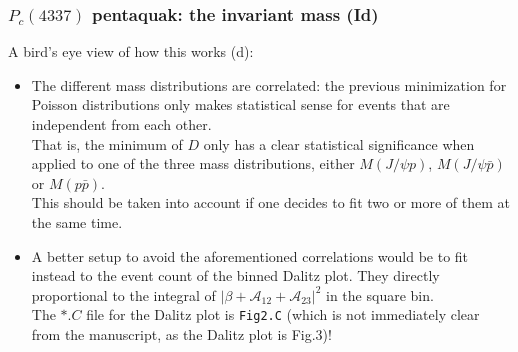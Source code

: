 \documentclass[utf8,10pt]{beamer}
\begin{document}
\begin{frame}
\frametitle{$P_{c}(4337)$ pentaquak: the invariant mass (Id)}

A bird's eye view of how this works (d): 

\begin{itemize}
  \item[(vii)] The different mass distributions are correlated: the previous
    minimization for Poisson distributions only makes statistical sense
    for events that are independent from each other. \\
    \vspace{0.15cm}
    That is, the minimum of $D$ only has a clear statistical significance
    when applied to one of the three mass distributions, either
    $M(J/\psi p)$, $M(J/\psi \bar{p})$ or $M(p \bar{p})$. \\
    \vspace{0.15cm}
    This should be taken into account if one decides to fit two or more of
    them at the same time.
    
  \item[(viii)] A better setup to avoid the aforementioned correlations would
    be to fit instead to the event count of the binned Dalitz plot.
    They directly proportional to the integral of
    $|\beta + \mathcal{A}_{12} + \mathcal{A}_{23}|^2$ in the square bin. \\
    \vspace{0.15cm}
    The $*.C$ file for the Dalitz plot is \texttt{Fig2.C} (which is not
    immediately clear from the manuscript, as the Dalitz plot is Fig.3)!
\end{itemize}

\end{frame}
\end{document}
